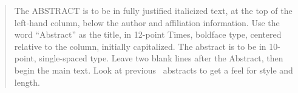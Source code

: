 \begin{abstract}
The ABSTRACT is to be in fully justified italicized text, at the top of the left-hand column, below the author and affiliation information.
Use the word ``Abstract'' as the title, in 12-point Times, boldface type, centered relative to the column, initially capitalized.
The abstract is to be in 10-point, single-spaced type.
Leave two blank lines after the Abstract, then begin the main text.
Look at previous \confName\ abstracts to get a feel for style and length.
\end{abstract}
